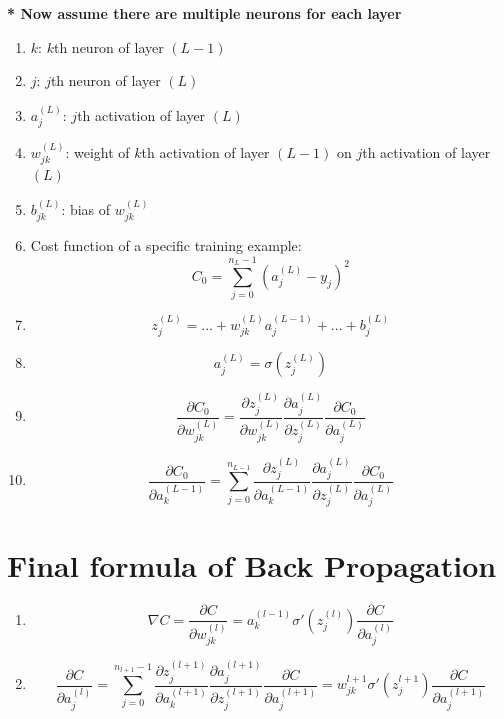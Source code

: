 \documentclass{article}
\begin{document}
    \textbf{* Now assume there are multiple neurons for each layer}
    \begin{enumerate}
        \item $k$: $k$th neuron of layer $(L-1)$
        \item $j$: $j$th neuron of layer $(L)$
        \item $a^{(L)}_{j}$: $j$th activation of layer $(L)$
        \item $w^{(L)}_{jk}$: weight of $k$th activation of layer $(L-1)$ on $j$th activation of layer $(L)$
        \item $b^{(L)}_{jk}$: bias of $w^{(L)}_{jk}$
        \item Cost function of a specific training example: $$C_0=\sum^{n_L-1}_{j=0}(a^{(L)}_{j}-y_j)^2$$
        \item $$z^{(L)}_{j}=...+w^{(L)}_{jk}a^{(L-1)}_{j}+...+b^{(L)}_{j}$$
        \item $$a^{(L)}_{j}=\sigma(z^{(L)}_{j})$$
        \item $$\frac{\partial C_0}{\partial w^{(L)}_{jk}}=\frac{\partial z^{(L)}_{j}}{\partial w^{(L)}_{jk}} \frac{\partial a^{(L)}_{j}}{\partial z^{(L)}_{j}} \frac{\partial C_0}{\partial a^{(L)}_{j}}$$
        \item $$\frac{\partial C_0}{\partial a^{(L-1)}_{k}}=\sum^{n_{L-1}}_{j=0}\frac{\partial z^{(L)}_{j}}{\partial a^{(L-1)}_{k}} \frac{\partial a^{(L)}_{j}}{\partial z^{(L)}_{j}} \frac{\partial C_0}{\partial a^{(L)}_{j}}$$


    \end{enumerate}

\section{Final formula of Back Propagation}
    \begin{enumerate}
        \item $$\nabla C=\frac{\partial C}{\partial w^{(l)}_{jk}}=a^{(l-1)}_{k}\sigma'(z^{(l)}_{j})\boxed{\frac{\partial C}{\partial a^{(l)}_{j}}}$$
        \item $$\boxed{\frac{\partial C}{\partial a^{(l)}_{j}}}=\sum^{n_{l+1}-1}_{j=0}\frac{\partial z^{(l+1)}_{j}}{\partial a^{(l+1)}_{k}} \frac{\partial a^{(l+1)}_{j}}{\partial z^{(l+1)}_{j}} \frac{\partial C}{\partial a^{(l+1)}_{j}}=w^{l+1}_{jk} \sigma'(z^{l+1}_{j}) \frac{\partial C}{\partial a^{(l+1)}_{j}}$$
    \end{enumerate}
    
\end{document}
